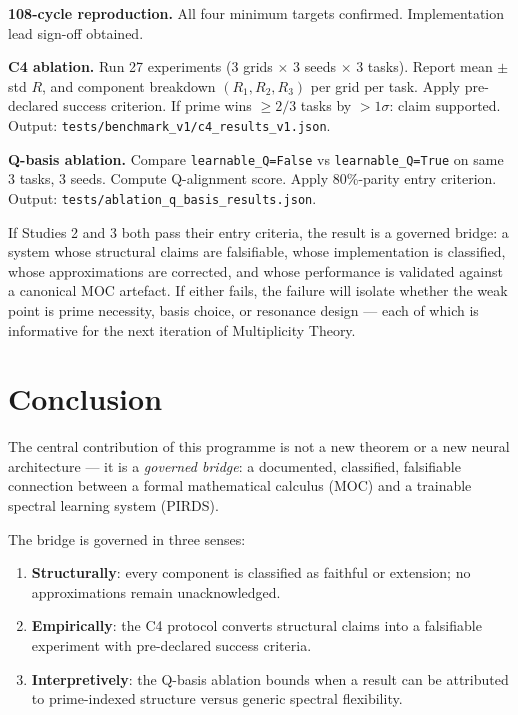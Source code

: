 \documentclass[11pt,a4paper]{article}
\theoremstyle{plain}
\theoremstyle{definition}
\theoremstyle{remark}
\begin{document}
\begin{description}[leftmargin=1.5em,itemsep=5pt]
  \item[Study 1 (done)] \textbf{108-cycle reproduction.} All four minimum targets confirmed.
    Implementation lead sign-off obtained.

  \item[Study 2 (14-day horizon)] \textbf{C4 ablation.} Run 27 experiments (3 grids $\times$
    3 seeds $\times$ 3 tasks). Report mean $\pm$ std $R$, and component breakdown $(R_1, R_2, R_3)$
    per grid per task. Apply pre-declared success criterion. If prime wins $\ge 2/3$ tasks by
    $> 1\sigma$: claim supported. Output: \texttt{tests/benchmark\_v1/c4\_results\_v1.json}.

  \item[Study 3 (7-day horizon, parallel with Study 2)] \textbf{Q-basis ablation.}
    Compare \texttt{learnable\_Q=False} vs \texttt{learnable\_Q=True} on same 3 tasks,
    3 seeds. Compute Q-alignment score. Apply 80\%-parity entry criterion.
    Output: \texttt{tests/ablation\_q\_basis\_results.json}.
\end{description}

\noindent If Studies 2 and 3 both pass their entry criteria, the result is a governed bridge:
a system whose structural claims are falsifiable, whose implementation is classified,
whose approximations are corrected, and whose performance is validated against a canonical
MOC artefact. If either fails, the failure will isolate whether the weak point is prime
necessity, basis choice, or resonance design --- each of which is informative for the next
iteration of Multiplicity Theory.

\section{Conclusion}

The central contribution of this programme is not a new theorem or a new neural architecture
--- it is a \emph{governed bridge}: a documented, classified, falsifiable connection between
a formal mathematical calculus (MOC) and a trainable spectral learning system (PIRDS).

The bridge is governed in three senses:
\begin{enumerate}[itemsep=3pt]
  \item \textbf{Structurally}: every component is classified as faithful or extension;
    no approximations remain unacknowledged.
  \item \textbf{Empirically}: the C4 protocol converts structural claims into a falsifiable
    experiment with pre-declared success criteria.
  \item \textbf{Interpretively}: the Q-basis ablation bounds when a result can be
    attributed to prime-indexed structure versus generic spectral flexibility.
\end{enumerate}
\end{document}
